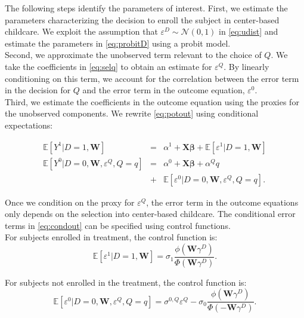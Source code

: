 \noindent The following steps identify the parameters of interest. First, we estimate the parameters characterizing the decision to enroll the subject in center-based childcare. We exploit the assumption that $\varepsilon^D \sim \mathcal{N} \left( 0, 1 \right)$ in \eqref{eq:udist} and estimate the parameters in \eqref{eq:probitD} using a probit model.\\

\noindent Second, we approximate the unobserved term relevant to the choice of $Q$. We take the coefficients in \eqref{eq:selq} to obtain an estimate for $\varepsilon^{Q}$. By linearly conditioning on this term, we account for the correlation between the error term in the decision for $Q$ and the error term in the outcome equation, $\varepsilon^0$.\\

\noindent Third, we estimate the coefficients in the outcome equation using the proxies for the unobserved components. We rewrite \eqref{eq:potout} using conditional expectations:

\begin{eqnarray}
\mathbb{E}\left[Y^1|D=1,\mathbf{W}\right]                         &=& \alpha^1+\mathbf{X}\mathbf{\beta}              +\mathbb{E}\left[\varepsilon^1|D=1,\mathbf{W}      \right] \nonumber \\
\mathbb{E}\left[Y^0|D=0,\mathbf{W},\varepsilon^{Q},Q=q\right] &=& \alpha^0+\mathbf{X}\mathbf{\beta} +\alpha^Q q \label{eq:condout} \\ \nonumber &+& \mathbb{E}\left[\varepsilon^0|D=0,\mathbf{W},\varepsilon^{Q},Q=q\right].
\end{eqnarray}

\noindent Once we condition on the proxy for $\varepsilon^{Q}$, the error term in the outcome equations only depends on the selection into center-based childcare. The conditional error terms in \eqref{eq:condout} can be specified using control functions.\\

\noindent For subjects enrolled in treatment, the control function is:
\begin{equation}
\mathbb{E} \left[\varepsilon^1|D=1,\mathbf{W} \right]=\sigma_1\frac{\phi \left( \mathbf{W} \gamma^D \right) }{ \Phi \left( \mathbf{W} \gamma^D \right) }. \label{eq:contam}
\end{equation}

\noindent For subjects not enrolled in the treatment, the control function is:
\begin{equation}
\mathbb{E} \left[\varepsilon^0|D=0,\mathbf{W},\varepsilon^{Q},Q=q\right]= \sigma^{0,Q}\varepsilon^{Q} - \sigma_0 \frac{\phi\left(\mathbf{W}\gamma^D\right)}{\Phi\left( - \mathbf{W} \gamma^D \right) }. \label{eq:home}
\end{equation}

